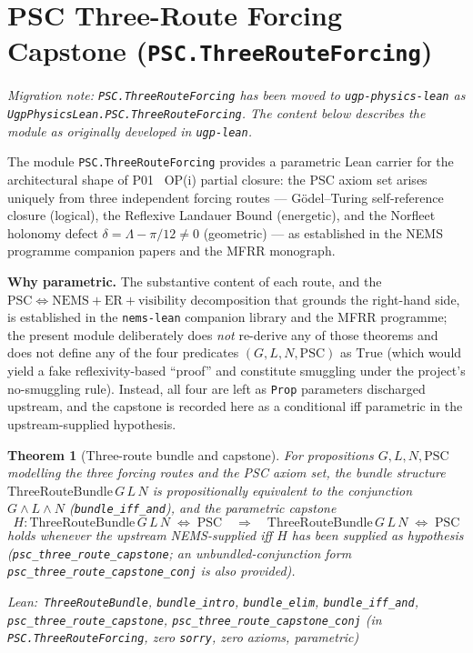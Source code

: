 \documentclass[11pt,a4paper]{article}
\newenvironment{leanref}%
  {\par\smallskip\noindent\begingroup\raggedright\textup{Lean:}~}%
  {\par\endgroup}
\newtheorem{theorem}{Theorem}[section]
\theoremstyle{definition}
\begin{document}
\section{PSC Three-Route Forcing Capstone (\texttt{PSC.ThreeRouteForcing})}
\label{sec:psc_three_route}

\noindent\textit{Migration note: \texttt{PSC.ThreeRouteForcing} has been moved to
\texttt{ugp-physics-lean} as \texttt{UgpPhysicsLean.PSC.ThreeRouteForcing}.
The content below describes the module as originally developed in \texttt{ugp-lean}.}

The module \texttt{PSC.ThreeRouteForcing} provides a parametric Lean carrier for
the architectural shape of P01~\cite{Spivack2026_SM_UGP} OP(i) partial closure:
the PSC axiom set arises uniquely from three independent forcing routes ---
G\"odel--Turing self-reference closure (logical), the Reflexive Landauer Bound
(energetic), and the Norfleet holonomy defect $\delta = \Lambda - \pi/12 \neq 0$
(geometric) --- as established in the NEMS programme companion papers and the
MFRR monograph.

\textbf{Why parametric.}
The substantive content of each route, and the
$\text{PSC} \Leftrightarrow \text{NEMS} + \text{ER} + \text{visibility}$
decomposition that grounds the right-hand side, is established in the
\texttt{nems-lean} companion library and the MFRR programme; the present module
deliberately does \emph{not} re-derive any of those theorems and does not define
any of the four predicates $(G, L, N, \text{PSC})$ as $\text{True}$ (which would
yield a fake reflexivity-based ``proof'' and constitute smuggling under the
project's no-smuggling rule).  Instead, all four are left as \texttt{Prop}
parameters discharged upstream, and the capstone is recorded here as a
conditional iff parametric in the upstream-supplied hypothesis.

\begin{theorem}[Three-route bundle and capstone]\label{thm:three_route}
For propositions $G, L, N, \text{PSC}$ modelling the three forcing routes and
the PSC axiom set, the bundle structure $\text{ThreeRouteBundle}\,G\,L\,N$
is propositionally equivalent to the conjunction $G \wedge L \wedge N$
(\lstinline|bundle_iff_and|), and the parametric capstone
\[
  H : \text{ThreeRouteBundle}\,G\,L\,N \;\Leftrightarrow\; \text{PSC}
  \quad\Longrightarrow\quad
  \text{ThreeRouteBundle}\,G\,L\,N \;\Leftrightarrow\; \text{PSC}
\]
holds whenever the upstream NEMS-supplied iff $H$ has been supplied as
hypothesis (\lstinline|psc_three_route_capstone|; an unbundled-conjunction
form \lstinline|psc_three_route_capstone_conj| is also provided).

\begin{leanref}\lstinline|ThreeRouteBundle|,
\lstinline|bundle_intro|,
\lstinline|bundle_elim|,
\lstinline|bundle_iff_and|,
\lstinline|psc_three_route_capstone|,
\lstinline|psc_three_route_capstone_conj|
\textup{(in \texttt{PSC.ThreeRouteForcing}, zero \texttt{sorry},
zero axioms, parametric)}\end{leanref}
\end{theorem}
\end{document}

